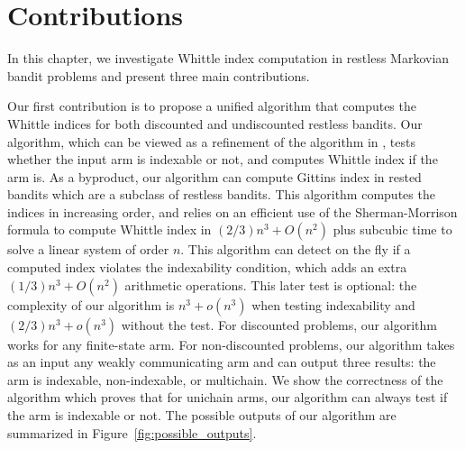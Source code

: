 \section{Contributions}
\label{ch:cpt:sec:contribute}

In this chapter, we investigate Whittle index computation in restless Markovian bandit problems and present three main contributions. 

Our first contribution is to propose a unified algorithm that computes the Whittle indices for both discounted and undiscounted restless bandits. Our algorithm, which can be viewed as a refinement of the algorithm in \cite{akbarzadeh2020conditions}, tests whether the input arm is indexable or not, and computes Whittle index if the arm is. As a byproduct, our algorithm can compute Gittins index in rested bandits which are a subclass of restless bandits.  This algorithm computes the indices in increasing order, and relies on an efficient use of the Sherman-Morrison formula to compute Whittle index in $(2/3)n^3 + O(n^2)$ plus subcubic time \cite{strassen1969gaussian} to solve a linear system of order $n$.
This algorithm can detect on the fly if a computed index violates the indexability condition, which adds an extra $(1/3)n^3+O(n^2)$ arithmetic operations. This later test is optional: the complexity of our algorithm is $n^3+o(n^3)$ when testing indexability and $(2/3)n^3 +o(n^3)$ without the test. For discounted problems, our algorithm works for any finite-state arm.  For non-discounted problems, our algorithm takes as an input any weakly communicating arm and can output three results: the arm is indexable, non-indexable, or multichain. %
We show the correctness of the algorithm which proves that for unichain arms, our algorithm can always test if the arm is indexable or not. The possible outputs of our algorithm are summarized in Figure~\ref{fig:possible_outputs}.

